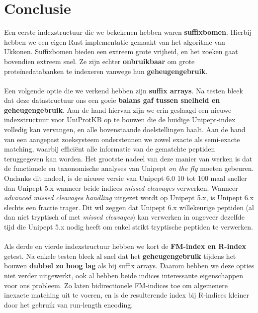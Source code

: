 \section{Conclusie}
Een eerste indexstructuur die we bekekenen hebben waren \textbf{suffixbomen}.
Hierbij hebben we een eigen Rust implementatie gemaakt van het algoritme van Ukkonen.
Suffixbomen bieden een extreem grote vrijheid, en het zoeken gaat bovendien extreem snel.
Ze zijn echter \textbf{onbruikbaar} om grote proteïnedatabanken te indexeren vanwege hun \textbf{geheugengebruik}.
\\ \\
Een volgende optie die we verkend hebben zijn \textbf{suffix arrays}.
Na testen bleek dat deze datastructuur ons een goeie \textbf{balans gaf tussen snelheid en geheugengebruik}.
Aan de hand hiervan zijn we erin geslaagd een nieuwe indexstructuur voor UniProtKB op te bouwen die de huidige Unipept-index volledig kan vervangen, en alle bovenstaande doelstellingen haalt.
Aan de hand van een aangepast zoeksysteem ondersteunen we zowel exacte als semi-exacte matching, waarbij efficiënt alle informatie van de gematchte peptiden teruggegeven kan worden.
Het grootste nadeel van deze manier van werken is dat de functionele en taxonomische analyses van Unipept \textit{on the fly} moeten gebeuren.
Ondanks dit nadeel, is de nieuwe versie van Unipept 6.0 10 tot 100 maal sneller dan Unipept 5.x wanneer beide indices \textit{missed cleavages} verwerken.
Wanneer \textit{advanced missed cleavages handling} uitgezet wordt op Unipept 5.x, is Unipept 6.x slechts een fractie trager.
Dit wil zeggen dat Unipept 6.x willekeurige peptiden (al dan niet tryptisch of met \textit{missed cleavages}) kan verwerken in ongeveer dezelfde tijd die Unipept 5.x nodig heeft om enkel strikt tryptische peptiden te verwerken.
\\ \\
Als derde en vierde indexstructuur hebben we kort de \textbf{FM-index en R-index} getest.
Na enkele testen bleek al snel dat het \textbf{geheugengebruik} tijdens het bouwen \textbf{dubbel zo hoog lag} als bij suffix arrays.
Daarom hebben we deze opties niet verder uitgewerkt, ook al hebben beide indices interessante eigenschappen voor ons probleem.
Zo laten bidirectionele FM-indices toe om algemenere inexacte matching uit te voeren, en is de resulterende index bij R-indices kleiner door het gebruik van run-length encoding.

